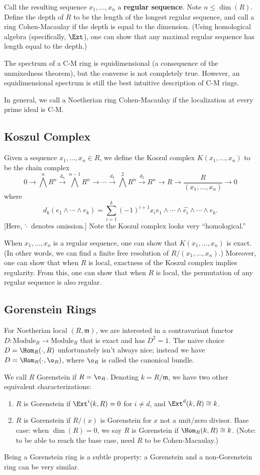 Call the resulting sequence $x_1, \dots, x_n$ a \textbf{regular sequence}. Note $n \le \dim(R)$. Define the depth of $R$ to be the length of the longest regular sequence, and call a ring Cohen-Macaulay if the depth is equal to the dimension. (Using homological algebra (specifically, $\Ext$), one can show that any maximal regular sequence has length equal to the depth.)

The spectrum of a C-M ring is equidimensional (a consequence of the unmixedness theorem), but the converse is not completely true. However, an equidimensional spectrum is still the best intuitive description of C-M rings.

In general, we call a Noetherian ring Cohen-Macaulay if the localization at every prime ideal is C-M.

\subsection{Koszul Complex}
Given a sequence $x_1, \dots, x_n \in R$, we define the Koszul complex $K(x_1, \dots, x_n)$ to be the chain complex
\[
    0 \to \bigwedge^n R^n \xrightarrow{d_n} \bigwedge^{n-1} R^n \to \cdots \xrightarrow{d_3}  \bigwedge^{2} R^n \xrightarrow{d_2} R^n \to R \to \frac{R}{(x_1, \dots, x_n)} \to 0
\]
where
\[
    d_k(e_1 \wedge \cdots \wedge e_k) = \sum_{i = 1}^k (-1)^{i+1}x_ie_1\wedge \cdots \wedge \hat{e_i} \wedge \cdots \wedge e_k.
\]
[Here, $\hat{\cdot}$ denotes omission.] Note the Koszul complex looks very ``homological.''

When $x_1, \dots, x_n$ is a regular sequence, one can show that $K(x_1, \dots, x_n)$ is exact. (In other words, we can find a finite free resolution of $R/(x_1, \dots, x_n)$.) Moreover, one can show that when $R$ is local, exactness of the Koszul complex implies regularity. From this, one can show that when $R$ is local, the permutation of any regular sequence is also regular.

\subsection{Gorenstein Rings}
For Noetherian local $(R, \mathfrak m)$, we are interested in a contravariant functor $D: \text{Module}_R \to \text{Module}_R$ that is exact and has $D^2 = 1$. The naive choice $D = \Hom_R(\cdot, R)$ unfortunately isn't always nice; instead we have $D = \Hom_R(\cdot, \o_R)$, where $\o_R$ is called the canonical bundle.

We call $R$ Gorenstein if $R = \o_R$. Denoting $k = R/\mathfrak m$, we have two other equivalent characterizations:
\begin{enumerate}
    \item $R$ is Gorenstein if $\Ext^i(k,R) = 0$ for $i \neq d$, and $\Ext^d(k,R) \cong k$.
    \item $R$ is Gorenstein if $R/(x)$ is Gorenstein for $x$ not a unit/zero divisor. Base case: when $\dim(R) = 0$, we say $R$ is Gorenstein if $\Hom_R(k, R) \cong k$. (Note: to be able to reach the base case, need $R$ to be Cohen-Macaulay.)
\end{enumerate}
Being a Gorenstein ring is a subtle property: a Gorenstein and a non-Gorenstein ring can be very similar.

